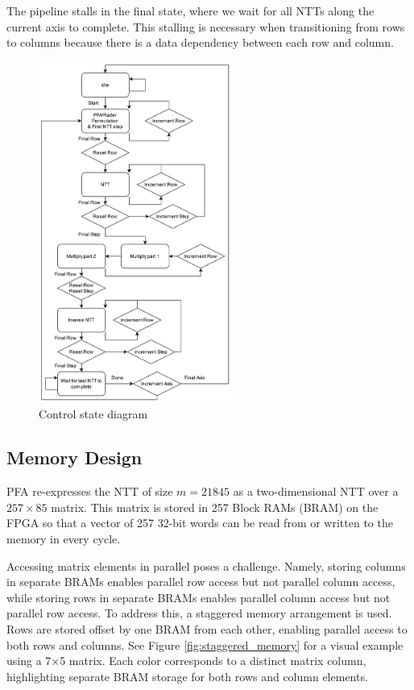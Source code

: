 \documentclass[lettersize,journal]{IEEEtran}
\begin{document}
The pipeline stalls in the final state, where we wait for all NTTs along the current axis to complete. This stalling is necessary when transitioning from rows to columns because there is a data dependency between each row and column.

\begin{figure}[h]
\centering
\includegraphics[width=2.5in]{img/control_flow.png}
\caption{Control state diagram}
\label{fig:state_diagram}
\end{figure}

\subsection{Memory Design}
PFA re-expresses the NTT of size $m = 21845$ as a two-dimensional NTT over a $257\times 85$ matrix. This matrix is stored in 257 Block RAMs (BRAM) on the FPGA so that a vector of 257 32-bit words can be read from or written to the memory in every cycle.

Accessing matrix elements in parallel poses a challenge. Namely, storing columns in separate BRAMs enables parallel row access but not parallel column access, while storing rows in separate BRAMs enables parallel column access but not parallel row access. To address this, a staggered memory arrangement is used. Rows are stored offset by one BRAM from each other, enabling parallel access to both rows and columns. See Figure \ref{fig:staggered_memory} for a visual example using a 7×5 matrix. Each color corresponds to a distinct matrix column, highlighting separate BRAM storage for both rows and column elements.
\end{document}
